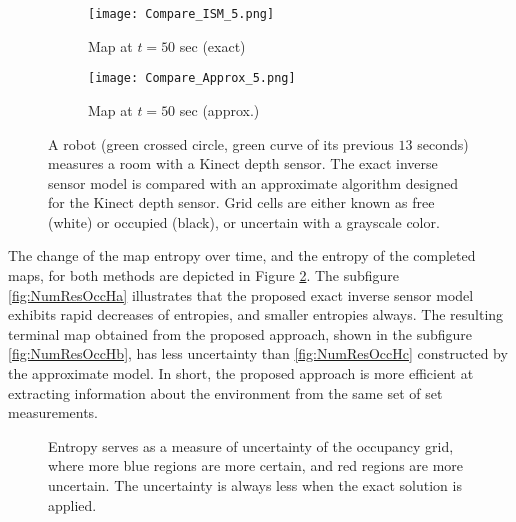\begin{figure}
{\begin{subfigure}[t]{0.4\columnwidth}
        \centering
        \texttt{[image: Compare\_ISM\_5.png]}
        \caption{Map at $t=50$ sec (exact)}
    \end{subfigure}
    \hspace*{-0.05\columnwidth}
    \begin{subfigure}[t]{0.4\columnwidth}
        \centering
        \texttt{[image: Compare\_Approx\_5.png]}
        \caption{Map at $t=50$ sec (approx.)}
    \end{subfigure}
    }
\caption{A robot (green crossed circle, green curve of its previous $13$ seconds) measures a room with a Kinect depth sensor. The exact inverse sensor model is compared with an approximate algorithm designed for the Kinect depth sensor. Grid cells are either known as free (white) or occupied (black), or uncertain with a grayscale color.
}
\label{fig:NumResOccProbs}
\end{figure}


The change of the map entropy over time, and the entropy of the completed maps, for both methods are depicted in Figure \ref{fig:NumResOccH}. The subfigure \ref{fig:NumResOccHa} illustrates that the proposed exact inverse sensor model exhibits rapid decreases of entropies, and smaller entropies always. The resulting terminal map obtained from the proposed approach, shown in the subfigure \ref{fig:NumResOccHb}, has less uncertainty than \ref{fig:NumResOccHc} constructed by the approximate model. In short, the proposed approach is more efficient at extracting information about the environment from the same set of set measurements. 


\begin{figure}
\caption{Entropy serves as a measure of uncertainty of the occupancy grid, where more blue regions are more certain, and red regions are more uncertain. The uncertainty is always less when the exact solution is applied.}\label{fig:NumResOccH}
\end{figure}


